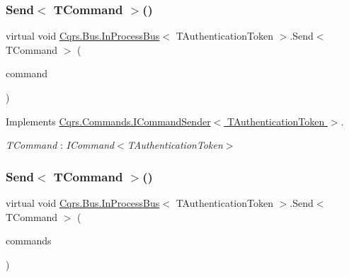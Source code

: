\subsubsection{\texorpdfstring{Send$<$ T\+Command $>$()}{Send< TCommand >()}\hspace{0.1cm}{\footnotesize\ttfamily [1/2]}}
{\footnotesize\ttfamily virtual void \hyperlink{classCqrs_1_1Bus_1_1InProcessBus}{Cqrs.\+Bus.\+In\+Process\+Bus}$<$ T\+Authentication\+Token $>$.Send$<$ T\+Command $>$ (\begin{DoxyParamCaption}\item[{T\+Command}]{command }\end{DoxyParamCaption})\hspace{0.3cm}{\ttfamily [virtual]}}



Implements \hyperlink{interfaceCqrs_1_1Commands_1_1ICommandSender_a551d69f8679399fc0ce0fd99dead507a}{Cqrs.\+Commands.\+I\+Command\+Sender$<$ T\+Authentication\+Token $>$}.

\begin{Desc}
\item[Type Constraints]\begin{description}
\item[{\em T\+Command} : {\em I\+Command$<$T\+Authentication\+Token$>$}]\end{description}
\end{Desc}
\mbox{\label{classCqrs_1_1Bus_1_1InProcessBus_ae5dae5f2445387280c974ec181167055}} 
\subsubsection{\texorpdfstring{Send$<$ T\+Command $>$()}{Send< TCommand >()}\hspace{0.1cm}{\footnotesize\ttfamily [2/2]}}
{\footnotesize\ttfamily virtual void \hyperlink{classCqrs_1_1Bus_1_1InProcessBus}{Cqrs.\+Bus.\+In\+Process\+Bus}$<$ T\+Authentication\+Token $>$.Send$<$ T\+Command $>$ (\begin{DoxyParamCaption}\item[{I\+Enumerable$<$ T\+Command $>$}]{commands }\end{DoxyParamCaption})\hspace{0.3cm}{\ttfamily [virtual]}}



